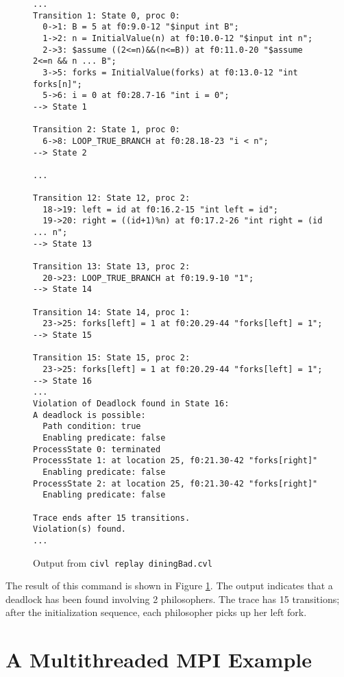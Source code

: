 \begin{figure}
  \begin{small}
\begin{verbatim}
...
Transition 1: State 0, proc 0: 
  0->1: B = 5 at f0:9.0-12 "$input int B";
  1->2: n = InitialValue(n) at f0:10.0-12 "$input int n";
  2->3: $assume ((2<=n)&&(n<=B)) at f0:11.0-20 "$assume 2<=n && n ... B";
  3->5: forks = InitialValue(forks) at f0:13.0-12 "int forks[n]";
  5->6: i = 0 at f0:28.7-16 "int i = 0";
--> State 1

Transition 2: State 1, proc 0: 
  6->8: LOOP_TRUE_BRANCH at f0:28.18-23 "i < n";
--> State 2

...

Transition 12: State 12, proc 2: 
  18->19: left = id at f0:16.2-15 "int left = id";
  19->20: right = ((id+1)%n) at f0:17.2-26 "int right = (id  ... n";
--> State 13

Transition 13: State 13, proc 2: 
  20->23: LOOP_TRUE_BRANCH at f0:19.9-10 "1";
--> State 14

Transition 14: State 14, proc 1: 
  23->25: forks[left] = 1 at f0:20.29-44 "forks[left] = 1";
--> State 15

Transition 15: State 15, proc 2: 
  23->25: forks[left] = 1 at f0:20.29-44 "forks[left] = 1";
--> State 16
...
Violation of Deadlock found in State 16:
A deadlock is possible:
  Path condition: true
  Enabling predicate: false
ProcessState 0: terminated
ProcessState 1: at location 25, f0:21.30-42 "forks[right]"
  Enabling predicate: false
ProcessState 2: at location 25, f0:21.30-42 "forks[right]"
  Enabling predicate: false

Trace ends after 15 transitions.
Violation(s) found.
...
\end{verbatim}
  \end{small}
  \caption{Output from \texttt{civl replay diningBad.cvl}}
  \label{fig:diningReplay}
\end{figure}

The result of this command is shown in Figure \ref{fig:diningReplay}.
The output indicates that a deadlock has been found involving 2
philosophers. The trace has 15 transitions; after the initialization
sequence, each philosopher picks up her left fork.

\section{A Multithreaded MPI Example}

